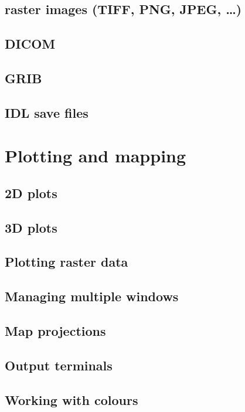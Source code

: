 \documentclass[10pt,titleauthor,openany]{mwbk}
\begin{document}
  \section{raster images (TIFF, PNG, JPEG, \ldots)}
  
  \section{DICOM}
  \section{GRIB}
  
  \section{IDL save files}
  

  \chapter{Plotting and mapping}
  \section{2D plots}
  
  \section{3D plots}
  
  \section{Plotting raster data}
  
  \section{Managing multiple windows}
  
  \section{Map projections}
  
  \section{Output terminals}
  
  \section{Working with colours}
  
\end{document}
